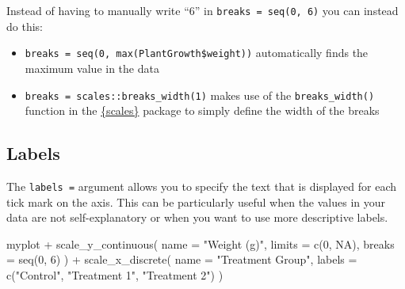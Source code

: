 \documentclass[
  letterpaper,
  DIV=11,
  numbers=noendperiod]{scrartcl}
\newenvironment{Shaded}{\begin{snugshade}}{\end{snugshade}}
\newcommand{\AttributeTok}[1]{\textcolor[rgb]{0.40,0.45,0.13}{#1}}
\newcommand{\ConstantTok}[1]{\textcolor[rgb]{0.56,0.35,0.01}{#1}}
\newcommand{\DecValTok}[1]{\textcolor[rgb]{0.68,0.00,0.00}{#1}}
\newcommand{\FunctionTok}[1]{\textcolor[rgb]{0.28,0.35,0.67}{#1}}
\newcommand{\NormalTok}[1]{\textcolor[rgb]{0.00,0.23,0.31}{#1}}
\newcommand{\SpecialCharTok}[1]{\textcolor[rgb]{0.37,0.37,0.37}{#1}}
\newcommand{\StringTok}[1]{\textcolor[rgb]{0.13,0.47,0.30}{#1}}
\providecommand{\tightlist}{%
  \setlength{\itemsep}{0pt}\setlength{\parskip}{0pt}}\usepackage{longtable,booktabs,array}
\begin{document}
\begin{tcolorbox}[enhanced jigsaw, coltitle=black, colbacktitle=quarto-callout-tip-color!10!white, titlerule=0mm, rightrule=.15mm, toprule=.15mm, left=2mm, arc=.35mm, colframe=quarto-callout-tip-color-frame, bottomrule=.15mm, toptitle=1mm, breakable, colback=white, bottomtitle=1mm, title=\textcolor{quarto-callout-tip-color}{\faLightbulb}\hspace{0.5em}{Tip}, opacitybacktitle=0.6, leftrule=.75mm, opacityback=0]

Instead of having to manually write ``6'' in
\texttt{breaks\ =\ seq(0,\ 6)} you can instead do this:

\begin{itemize}
\tightlist
\item
  \texttt{breaks\ =\ seq(0,\ max(PlantGrowth\$weight))} automatically
  finds the maximum value in the data
\item
  \texttt{breaks\ =\ scales::breaks\_width(1)} makes use of the
  \texttt{breaks\_width()} function in the
  \href{https://scales.r-lib.org/index.html}{\{scales\}} package to
  simply define the width of the breaks
\end{itemize}

\end{tcolorbox}

\hypertarget{labels}{%
\subsection{Labels}\label{labels}}

The \texttt{labels\ =} argument allows you to specify the text that is
displayed for each tick mark on the axis. This can be particularly
useful when the values in your data are not self-explanatory or when you
want to use more descriptive labels.

\begin{Shaded}
\begin{Highlighting}[]
\NormalTok{myplot }\SpecialCharTok{+}
  \FunctionTok{scale\_y\_continuous}\NormalTok{(}
    \AttributeTok{name =} \StringTok{"Weight (g)"}\NormalTok{,}
    \AttributeTok{limits =} \FunctionTok{c}\NormalTok{(}\DecValTok{0}\NormalTok{, }\ConstantTok{NA}\NormalTok{),}
    \AttributeTok{breaks =} \FunctionTok{seq}\NormalTok{(}\DecValTok{0}\NormalTok{, }\DecValTok{6}\NormalTok{)}
\NormalTok{  ) }\SpecialCharTok{+}
  \FunctionTok{scale\_x\_discrete}\NormalTok{(}
    \AttributeTok{name =} \StringTok{"Treatment Group"}\NormalTok{,}
    \AttributeTok{labels =} \FunctionTok{c}\NormalTok{(}\StringTok{"Control"}\NormalTok{, }\StringTok{"Treatment 1"}\NormalTok{, }\StringTok{"Treatment 2"}\NormalTok{)}
\NormalTok{  )}
\end{Highlighting}
\end{Shaded}
\end{document}
